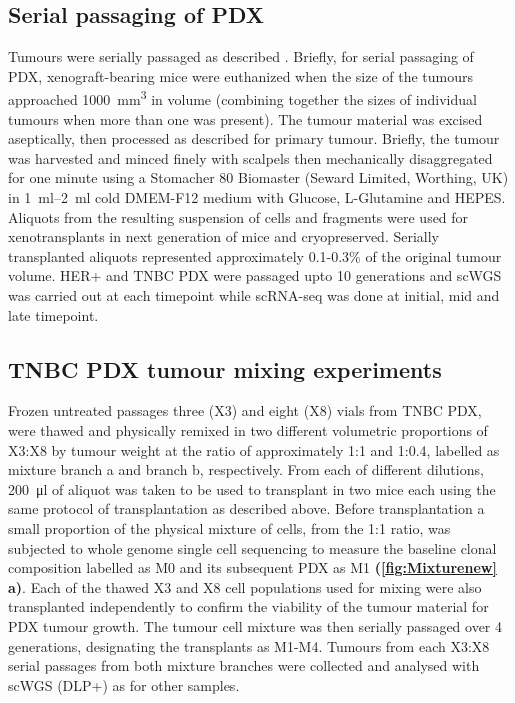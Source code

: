 \subsection{Serial passaging of PDX}
Tumours were serially passaged as  described \cite{eirew2015dynamics}.
Briefly, for serial passaging of PDX, xenograft-bearing mice were euthanized when the size of the tumours approached \SI{1000}{\mm\cubed} in volume (combining together the sizes of individual tumours when more than one was present).
The tumour material was excised aseptically, then processed as described for primary tumour. 
Briefly, the tumour was harvested and minced finely with scalpels then mechanically disaggregated for one minute using a Stomacher 80 Biomaster (Seward Limited, Worthing, UK) in \SIrange{1}{2}{\ml} cold DMEM-F12 medium with Glucose, L-Glutamine and HEPES. 
Aliquots from the resulting suspension of cells and fragments were used for xenotransplants in next generation of mice and cryopreserved.
Serially transplanted aliquots represented approximately 0.1-0.3\%  of the original tumour volume. HER+ and TNBC PDX were passaged upto 10 generations and scWGS was carried out at each timepoint while scRNA-seq was done at initial, mid and late timepoint. 

\subsection{TNBC PDX tumour mixing experiments} Frozen untreated passages three (X3) and eight (X8) vials from TNBC PDX, were thawed and  physically remixed in two different volumetric proportions of X3:X8 by tumour weight at the ratio of approximately 1:1 and 1:0.4, labelled as mixture branch a and branch b, respectively. From each of different dilutions, \SI{200}{\ul} of aliquot was taken to be used to transplant in two mice each using the same protocol of transplantation as described above. Before transplantation a small proportion of the physical mixture of cells, from the 1:1 ratio, was subjected to whole genome single cell sequencing to measure the baseline clonal composition labelled as M0 and its subsequent PDX as M1 \textbf{(\autoref{fig:Mixturenew} a)}. Each of the thawed X3 and X8 cell populations used for mixing were also transplanted independently to confirm the viability of the tumour material for PDX tumour growth. The tumour cell mixture was then serially passaged over 4 generations, designating the transplants as M1-M4. Tumours from each X3:X8 serial passages from both mixture branches were collected and analysed with scWGS (DLP+) as for other samples.

